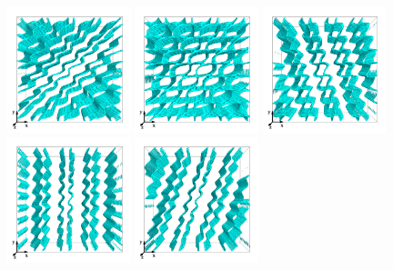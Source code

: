\documentclass[8.5pt,twoside,twocolumn]{article}
\begin{document}
\begin{figure}[htpb]
\includegraphics[width=0.32\textwidth]{disc-364k_run914r.png}
\includegraphics[width=0.32\textwidth]{disc-366k_run914r.png}
\includegraphics[width=0.32\textwidth]{disc-368k_run914r.png}\\
\includegraphics[width=0.32\textwidth]{disc-370k_run914r.png}
\includegraphics[width=0.32\textwidth]{disc-372k_run914r.png}

\end{figure}
\end{document}
